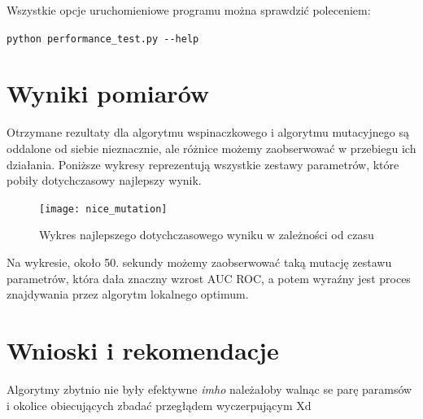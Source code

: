 \documentclass[11pt]{article}
\begin{document}
Wszystkie opcje uruchomieniowe programu można sprawdzić poleceniem:

 \texttt{python performance\_test.py -\--help}

\section{Wyniki pomiarów}
Otrzymane rezultaty dla algorytmu wspinaczkowego i algorytmu mutacyjnego są oddalone od siebie nieznacznie, ale różnice możemy zaobserwować w przebiegu ich działania. Poniższe wykresy reprezentują wszystkie zestawy parametrów, które pobiły dotychczasowy najlepszy wynik.
\begin{figure}[H]
	\caption{Wykres najlepszego dotychczasowego wyniku w zależności od czasu}
	\label{nice_mutation}
	\centering
	\texttt{[image: nice\_mutation]}
\end{figure}
Na wykresie, około 50. sekundy możemy zaobserwować taką mutację zestawu parametrów, która dała znaczny wzrost AUC ROC, a potem wyraźny jest proces znajdywania przez algorytm lokalnego optimum.


\section{Wnioski i rekomendacje}
Algorytmy zbytnio nie były efektywne \textit{imho} należałoby walnąc se parę paramsów i okolice obiecujących zbadać przegłądem wyczerpującym Xd
\end{document}
